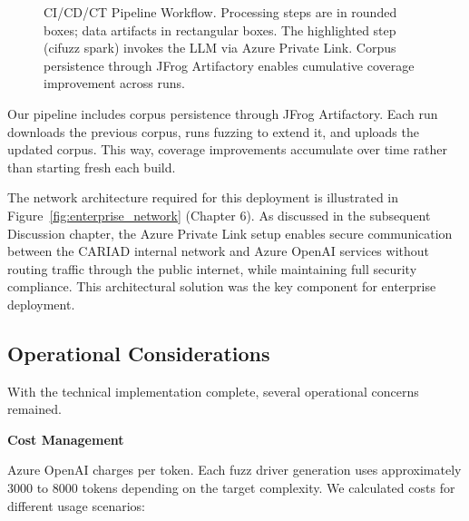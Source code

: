 \begin{figure}[htbp]
{
    }
    \caption{CI/CD/CT Pipeline Workflow. Processing steps are in rounded boxes; data artifacts in rectangular boxes. The highlighted step (cifuzz spark) invokes the LLM via Azure Private Link. Corpus persistence through JFrog Artifactory enables cumulative coverage improvement across runs.}
    \label{fig:cicd_workflow}
\end{figure}

Our pipeline includes corpus persistence through JFrog Artifactory. Each run downloads the previous corpus, runs fuzzing to extend it, and uploads the updated corpus. This way, coverage improvements accumulate over time rather than starting fresh each build.

The network architecture required for this deployment is illustrated in Figure~\ref{fig:enterprise_network} (Chapter 6). As discussed in the subsequent Discussion chapter, the Azure Private Link setup enables secure communication between the CARIAD internal network and Azure OpenAI services without routing traffic through the public internet, while maintaining full security compliance. This architectural solution was the key component for enterprise deployment.

\subsection{Operational Considerations}

With the technical implementation complete, several operational concerns remained.

\textbf{Cost Management}

Azure OpenAI charges per token. Each fuzz driver generation uses approximately 3000 to 8000 tokens depending on the target complexity. We calculated costs for different usage scenarios:

